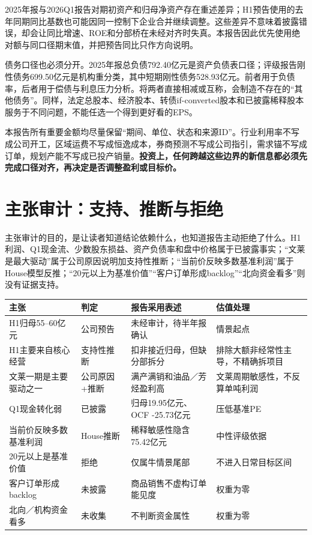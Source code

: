 2025年报与2026Q1报告对期初资产和归母净资产存在重述差异；H1预告使用的去年同期同比基数也可能因同一控制下企业合并继续调整。这些差异不意味着披露错误，却会让同比增速、ROE和分部桥在未经对齐时失真。本报告因此优先使用绝对额与同口径期末值，并把预告同比只作方向说明。

债务口径也必须分开。2025年报总负债792.40亿元是资产负债表口径；评级报告刚性债务699.50亿元是机构重分类，其中短期刚性债务528.93亿元。前者用于负债率，后者用于偿债与利息压力分析。将两者直接相减或互称，会制造不存在的“其他债务”。同样，法定总股本、经济股本、转债if-converted股本和已披露稀释股本服务于不同问题，不能任选一个得到更好看的EPS。

\begin{sourcequalitybox}[正式边界]
本报告所有重要金额均尽量保留“期间、单位、状态和来源ID”。行业利用率不写成公司开工，区域运费不写成恒逸成本，券商预测不写成公司指引，需求锚不写成订单，规划产能不写成已投产销量。\textbf{投资上，任何跨越这些边界的新信息都必须先完成口径对齐，再决定是否调整盈利或目标价。}
\end{sourcequalitybox}

\section{主张审计：支持、推断与拒绝}

主张审计的目的，是让读者知道结论依赖什么，也知道报告主动拒绝了什么。H1利润、Q1现金流、少数股东损益、资产负债率和盘中价格属于已披露事实；“文莱是最大驱动”属于公司原因说明加支持性推断；“当前价反映多数基准利润”属于House模型反推；“20元以上为基准价值”“客户订单形成backlog”“北向资金看多”则没有证据支持。

\begin{exhibitbox}[高影响主张审计]
\small
\noindent\begin{tabularx}{\textwidth}{L{3.45cm}L{2.1cm}L{3.2cm}X}
\toprule
\textbf{主张} & \textbf{判定} & \textbf{报告采用表述} & \textbf{估值处理} \\
\midrule
H1归母55--60亿元 & 公司预告 & 未经审计，待半年报确认 & 情景起点 \\
H1主要来自核心经营 & 支持性推断 & 扣非接近归母，但缺分部拆分 & 排除大额非经常性主导，不精确拆项目 \\
文莱一期是主要驱动之一 & 公司原因+推断 & 满产满销和油品／芳烃盈利高 & 文莱周期敏感性，不反算单吨利润 \\
Q1现金转化弱 & 已披露 & 归母19.95亿元、OCF -25.73亿元 & 压低基准PE \\
当前价反映多数基准利润 & House推断 & 稀释敏感性隐含75.42亿元 & 中性评级依据 \\
20元以上是基准价值 & 拒绝 & 仅属牛情景尾部 & 不进入日常目标区间 \\
客户订单形成backlog & 未披露 & 商品销售不虚构订单能见度 & 权重为零 \\
北向／机构资金看多 & 未收集 & 不判断资金属性 & 权重为零 \\
\bottomrule
\end{tabularx}
\end{exhibitbox}

